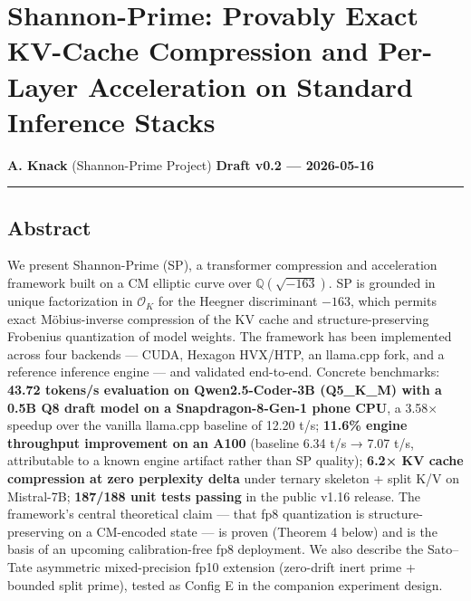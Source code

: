 \documentclass[
  11pt,
]{article}
\author{}
\date{}
\begin{document}
\hypertarget{shannon-prime-provably-exact-kv-cache-compression-and-per-layer-acceleration-on-standard-inference-stacks}{%
\section{Shannon-Prime: Provably Exact KV-Cache Compression and
Per-Layer Acceleration on Standard Inference
Stacks}\label{shannon-prime-provably-exact-kv-cache-compression-and-per-layer-acceleration-on-standard-inference-stacks}}

\textbf{A. Knack} (Shannon-Prime Project) \textbf{Draft v0.2 ---
2026-05-16}

\begin{center}\rule{0.5\linewidth}{0.5pt}\end{center}

\hypertarget{abstract}{%
\subsection{Abstract}\label{abstract}}

We present Shannon-Prime (SP), a transformer compression and
acceleration framework built on a CM elliptic curve over
\(\mathbb{Q}(\sqrt{-163})\). SP is grounded in unique factorization in
\(\mathcal{O}_K\) for the Heegner discriminant \(-163\), which permits
exact Möbius-inverse compression of the KV cache and
structure-preserving Frobenius quantization of model weights. The
framework has been implemented across four backends --- CUDA, Hexagon
HVX/HTP, an llama.cpp fork, and a reference inference engine --- and
validated end-to-end. Concrete benchmarks: \textbf{43.72 tokens/s
evaluation on Qwen2.5-Coder-3B (Q5\_K\_M) with a 0.5B Q8 draft model on
a Snapdragon-8-Gen-1 phone CPU}, a 3.58× speedup over the vanilla
llama.cpp baseline of 12.20 t/s; \textbf{11.6\% engine throughput
improvement on an A100} (baseline 6.34 t/s → 7.07 t/s, attributable to a
known engine artifact rather than SP quality); \textbf{6.2× KV cache
compression at zero perplexity delta} under ternary skeleton + split K/V
on Mistral-7B; \textbf{187/188 unit tests passing} in the public v1.16
release. The framework's central theoretical claim --- that fp8
quantization is structure-preserving on a CM-encoded state --- is proven
(Theorem 4 below) and is the basis of an upcoming calibration-free fp8
deployment. We also describe the Sato--Tate asymmetric mixed-precision
fp10 extension (zero-drift inert prime + bounded split prime), tested as
Config E in the companion experiment design.
\end{document}
